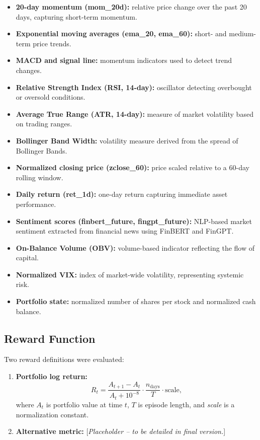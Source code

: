 \documentclass[12pt,a4paper]{report}
\begin{document}
\begin{itemize}
    \item \textbf{20-day momentum (mom\_20d):} relative price change over the past 20 days, capturing short-term momentum.
    \item \textbf{Exponential moving averages (ema\_20, ema\_60):} short- and medium-term price trends.
    \item \textbf{MACD and signal line:} momentum indicators used to detect trend changes.
    \item \textbf{Relative Strength Index (RSI, 14-day):} oscillator detecting overbought or oversold conditions.
    \item \textbf{Average True Range (ATR, 14-day):} measure of market volatility based on trading ranges.
    \item \textbf{Bollinger Band Width:} volatility measure derived from the spread of Bollinger Bands.
    \item \textbf{Normalized closing price (zclose\_60):} price scaled relative to a 60-day rolling window.
    \item \textbf{Daily return (ret\_1d):} one-day return capturing immediate asset performance.
    \item \textbf{Sentiment scores (finbert\_future, fingpt\_future):} NLP-based market sentiment extracted from financial news using FinBERT and FinGPT.
    \item \textbf{On-Balance Volume (OBV):} volume-based indicator reflecting the flow of capital.
    \item \textbf{Normalized VIX:} index of market-wide volatility, representing systemic risk.
    \item \textbf{Portfolio state:} normalized number of shares per stock and normalized cash balance.
\end{itemize}

\subsection{Reward Function}
Two reward definitions were evaluated:
\begin{enumerate}
    \item \textbf{Portfolio log return:}
    \[
    R_t = \frac{A_{t+1} - A_t}{A_t + 10^{-8}} \cdot \frac{n_{\text{days}}}{T} \cdot \text{scale},
    \]
    where $A_t$ is portfolio value at time $t$, $T$ is episode length, and \textit{scale} is a normalization constant.
    \item \textbf{Alternative metric:} [\textit{Placeholder – to be detailed in final version.}]
\end{enumerate}
\end{document}
